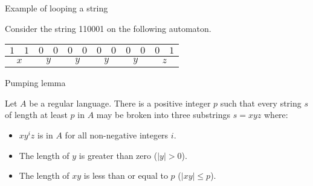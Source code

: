 \documentclass{beamer}
\begin{document}
  \begin{frame}[fragile]{Example of looping a string}
  
    Consider the string 110001 on the following automaton.
  
    \begin{center}
    \end{center}
  
    \vspace{2mm}
  
    \begin{table}
    \begin{tabular}{|cc|cc|cc|cc|cc|cc|}
      \hline
      $1$ & $1$ & $0$ & $0$ & $0$ & $0$ & $0$ & $0$ & $0$ & $0$ & $0$ & $1$ \\
      \hline
      \multicolumn{2}{|c|}{$x$} &
      \multicolumn{2}{c|}{$y$} &
      \multicolumn{2}{c|}{$y$} &
      \multicolumn{2}{c|}{$y$} &
      \multicolumn{2}{c|}{$y$} &
      \multicolumn{2}{c|}{$z$} \\
      \hline
    \end{tabular}
  \end{table}
  
  \end{frame}
  
  
  \begin{frame}{Pumping lemma}
    \begin{theorem}
      \vspace{2mm}
      Let $A$ be a regular language.
      There is a positive integer $p$ such that every string $s$ of length at least $p$ in $A$ may be broken into three substrings \( s = xyz \) where:
  
      \begin{itemize}
        \item \( xy^iz \) is in $A$ for all non-negative integers $i$.
        \item The length of $y$ is greater than zero ($|y| > 0$).
        \item The length of $xy$ is less than or equal to $p$ ($|xy| \leq p$).
      \end{itemize}
      \vspace{2mm}
    \end{theorem}
  
  \end{frame}
  
\end{document}
